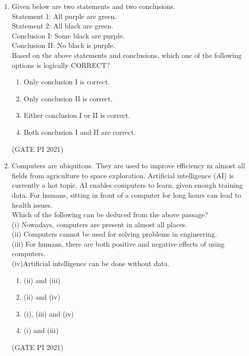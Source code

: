 \documentclass[journal,12pt,onecolumn]{IEEEtran}
\theoremstyle{remark}
\begin{document}
\begin{enumerate}
\item
Given below are two statements and two conclusions.\\
Statement 1: All purple are green.\\
Statement 2: All black are green.\\
Conclusion I: Some black are purple.\\
Conclusion II: No black is purple.\\
Based on the above statements and conclusions, which one of the following options is logically CORRECT?
\begin{multicols}{2}
\begin{enumerate}
\item Only conclusion I is correct.
\item Only conclusion II is correct.
\item Either conclusion I or II is correct.
\item Both conclusion I and II are correct.
\end{enumerate}
\end{multicols}
\hfill (GATE PI 2021)

\item
Computers are ubiquitous. They are used to improve efficiency in almost all fields from agriculture to space exploration. Artificial intelligence (AI) is currently a hot topic. AI enables computers to learn, given enough training data. For humans, sitting in front of a computer for long hours can lead to health issues.\\

Which of the following can be deduced from the above passage?\\
(i) Nowadays, computers are present in almost all places.\\
(ii) Computers cannot be used for solving problems in engineering.\\
(iii) For humans, there are both positive and negative effects of using computers.\\
(iv)Artificial intelligence can be done without data.
\begin{multicols}{4}
\begin{enumerate}
\item (ii) and (iii)
\item (ii) and (iv)
\item (i), (iii) and (iv)
\item (i) and (iii)
\end{enumerate}
\end{multicols}
\hfill (GATE PI 2021)


\end{enumerate}
\end{document}
